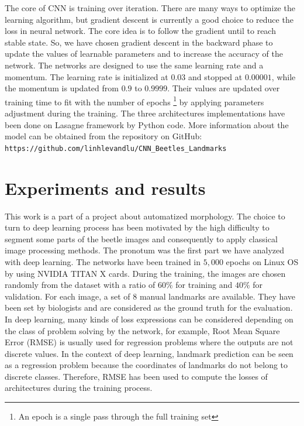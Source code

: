 \documentclass[review]{elsarticle}
\begin{document}
The core of CNN is training over iteration. There are many ways to optimize the learning algorithm, but gradient descent \cite{lecun2012efficient} is currently a good choice to reduce the loss in neural network. The core idea is to follow the gradient until to reach stable state. So, we have chosen gradient descent in the backward phase to update the values of learnable parameters and to increase the accuracy of the network. The networks are designed to use the same learning rate and a momentum. The learning rate is initialized at $0.03$ and stopped at $0.00001$, while the momentum is updated from $0.9$ to $0.9999$. Their values are updated over training time to fit with the number of epochs \footnote{An epoch is a single pass through the full training set} by applying parameters adjustment during the training. The three architectures implementations have been done on Lasagne framework \cite{lasagne} by Python code. More information about the model can be obtained from the repository on GitHub: \texttt{https://github.com/linhlevandlu/CNN\_Beetles\_Landmarks}

\section{Experiments and results}
\label{sexperiments}
This work is a part of a project about automatized morphology. The choice to turn to deep learning process has been motivated by the high difficulty to segment some parts of the beetle images and consequently to apply classical image processing methods. The pronotum was the first part we have analyzed with deep learning. The networks have been trained in $5, 000$ epochs on Linux OS by using NVIDIA TITAN X cards. During the training, the images are chosen randomly from the dataset with a ratio of $60\%$ for training and $40\%$ for validation. For each image, a set of $8$ manual landmarks are available. They have been set by biologists and are considered as the ground truth for the evaluation. In deep learning, many kinds of loss expressions can be considered depending on the class of problem solving by the network, for example, Root Mean Square Error (RMSE) is usually used for regression problems where the outputs are not discrete values. In the context of deep learning, landmark prediction can be seen as a regression problem because the coordinates of landmarks do not belong to discrete classes. Therefore, RMSE has been used to compute the losses of architectures during the training process. 
\end{document}
